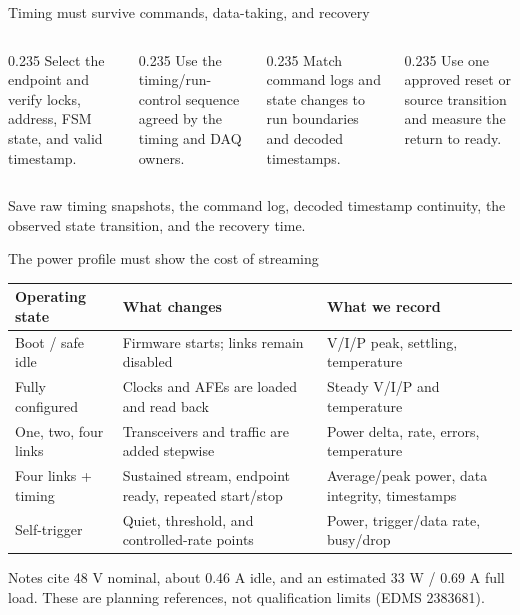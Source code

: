 \documentclass[aspectratio=169,11pt]{beamer}
\begin{document}
\begin{frame}{Timing must survive commands, data-taking, and recovery}
  \begin{columns}[T,onlytextwidth]
    \begin{column}{0.235\textwidth}
        {Select the endpoint and verify locks, address, FSM state, and valid timestamp.}
    \end{column}
    \begin{column}{0.235\textwidth}
        {Use the timing/run-control sequence agreed by the timing and DAQ owners.}
    \end{column}
    \begin{column}{0.235\textwidth}
        {Match command logs and state changes to run boundaries and decoded timestamps.}
    \end{column}
    \begin{column}{0.235\textwidth}
        {Use one approved reset or source transition and measure the return to ready.}
    \end{column}
  \end{columns}

  \medskip
    {Save raw timing snapshots, the command log, decoded timestamp continuity, the observed state transition, and the recovery time.}
\end{frame}

\begin{frame}{The power profile must show the cost of streaming}
  \footnotesize
  \renewcommand{\arraystretch}{1.03}
  \begin{tabularx}{\textwidth}{@{}p{} X p{}@{}}
    \toprule
    Operating state & What changes & What we record \\
    \midrule
    Boot / safe idle & Firmware starts; links remain disabled & V/I/P peak, settling, temperature \\
    Fully configured & Clocks and AFEs are loaded and read back & Steady V/I/P and temperature \\
    One, two, four links & Transceivers and traffic are added stepwise & Power delta, rate, errors, temperature \\
    Four links + timing & Sustained stream, endpoint ready, repeated start/stop & Average/peak power, data integrity, timestamps \\
    Self-trigger & Quiet, threshold, and controlled-rate points & Power, trigger/data rate, busy/drop \\
    \bottomrule
  \end{tabularx}

    {Notes cite 48 V nominal, about 0.46 A idle, and an estimated 33 W / 0.69 A full load. These are planning references, not qualification limits (EDMS 2383681).}
\end{frame}
\end{document}
